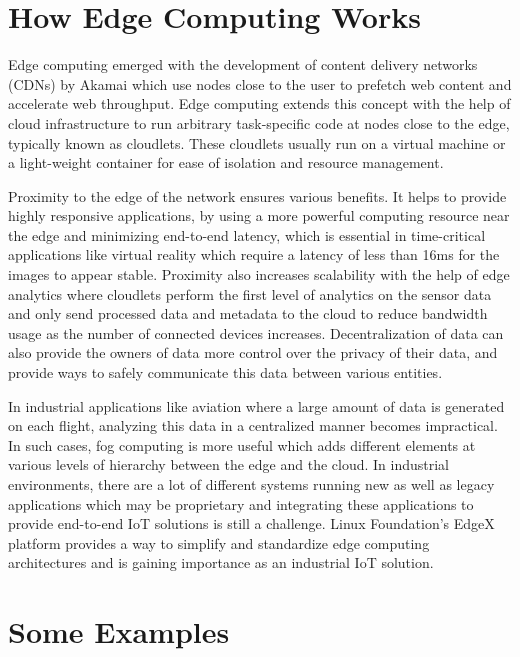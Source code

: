 \documentclass[sigconf]{acmart}
\begin{document}
\section{How Edge Computing Works}
Edge computing emerged with the development of content delivery networks (CDNs) by Akamai which use nodes close to the user to prefetch web content and accelerate web throughput. Edge computing extends this concept with the help of cloud infrastructure to run arbitrary task-specific code at nodes close to the edge, typically known as cloudlets. These cloudlets usually run on a virtual machine or a light-weight container for ease of isolation and resource management\cite{satyanarayananemergence}.

Proximity to the edge of the network ensures various benefits. It helps to provide highly responsive applications, by using a more powerful computing resource near the edge and minimizing end-to-end latency, which is essential in time-critical applications like virtual reality which require a latency of less than 16ms for the images to appear stable\cite{rocket-real-time-video}\cite{satyanarayananemergence}. Proximity also increases scalability with the help of edge analytics where cloudlets perform the first level of analytics on the sensor data and only send processed data and metadata to the cloud to reduce bandwidth usage as the number of connected devices increases\cite{satyanarayananemergence}.  Decentralization of data can also provide the owners of data more control over the privacy of their data, and provide ways to safely communicate this data between various entities\cite{ibm_iot_edge}\cite{FADES-offloading}.

In industrial applications like aviation where a large amount of data is generated on each flight\cite{satyanarayananemergence}, analyzing this data in a centralized manner becomes impractical. In such cases, fog computing is more useful which adds different elements at various levels of hierarchy between the edge and the cloud\cite{rt_insights_iiot}. In industrial environments, there are a lot of different systems running new as well as legacy applications which may be proprietary and integrating these applications to provide end-to-end IoT solutions is still a challenge. Linux Foundation's EdgeX platform provides a way to simplify and standardize edge computing architectures and is gaining importance as an industrial IoT solution\cite{rt_insights_iiot}.

\section{Some Examples}
\end{document}
